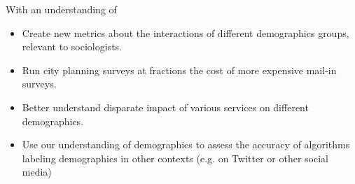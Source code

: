 \documentclass[12pt]{article}
\begin{document}
With an understanding of 
\begin{itemize}
  \item Create new metrics about the interactions of different demographics groups, relevant to sociologists.
  \item Run city planning surveys at fractions the cost of more expensive mail-in surveys.
  \item Better understand disparate impact of various services on different demographics.
  \item Use our understanding of demographics to assess the accuracy of algorithms labeling demographics in other contexts (e.g. on Twitter or other social media)
\end{itemize}










\pagebreak

\begin{footnotesize}

% 

\end{footnotesize}
\end{document}
